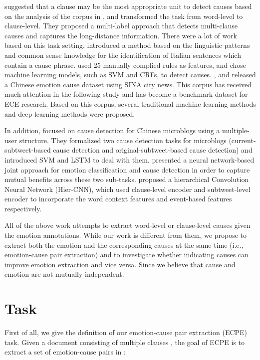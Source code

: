 \documentclass[11pt,a4paper]{article}
\begin{document}
\citet{chen2010emotion} suggested that a clause may be the most appropriate unit to detect causes based on the analysis of the corpus in \cite{lee2010text}, and transformed the task from word-level to clause-level. They proposed a multi-label approach that detects multi-clause causes and captures the long-distance information. There were a lot of work based on this task setting. \citet{russo2011emocause} introduced a method based on the linguistic patterns and common sense knowledge for the identification of Italian sentences which contain a cause phrase. \citet{gui2014emotion} used 25 manually complied rules as features, and chose machine learning models, such as SVM and CRFs, to detect causes. \citet{gui2016event}, \citet{gui2016emotion} and \citet{xu2017ensemble} released a Chinese emotion cause dataset using SINA city news. This corpus has received much attention in the following study and has become a benchmark dataset for ECE research. Based on this corpus, several traditional machine learning methods \cite{gui2016event, gui2016emotion, xu2017ensemble} and  deep learning methods \cite{gui2017question, li2018co, yu2019multiple, xu2019extracting} were proposed.

In addition, \citet{cheng2017emotion} focused on cause detection for Chinese microblogs using a multiple-user structure. They formalized two cause detection tasks for microblogs (current-subtweet-based cause detection and original-subtweet-based cause detection) and introduced SVM and LSTM to deal with them. \citet{chen2018joint} presented a neural network-based joint approach for emotion classification and cause detection in order to capture mutual benefits across these two sub-tasks. \citet{chen2018hierarchical} proposed a hierarchical Convolution Neural Network (Hier-CNN), which used clause-level encoder and subtweet-level encoder to incorporate the word context features and event-based features respectively.

All of the above work attempts to extract word-level or clause-level causes given the emotion annotations.  While our work is different from them, we propose to extract both the emotion and the corresponding causes at the same time (i.e., emotion-cause pair extraction) and to investigate whether indicating causes can improve emotion extraction and vice versa. Since we believe that cause and emotion are not mutually independent.

\section{Task}
First of all, we give the definition of our emotion-cause pair extraction (ECPE) task. Given a document consisting of multiple clauses ,  the goal of ECPE is to extract a set of emotion-cause pairs in :
\end{document}
